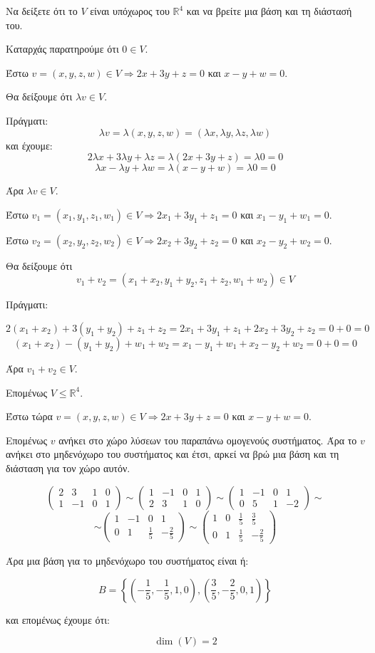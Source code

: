 \begin{enumerate}[1.]
Να δείξετε ότι το $V$ είναι υπόχωρος του $\mathbb{R}^4$ και να βρείτε μια βάση και τη διάστασή του.

\vspace{\baselineskip}


\vspace{\baselineskip}

Καταρχάς παρατηρούμε ότι $0\in V$. 

Έστω $v=(x,y,z,w)\in V \Rightarrow 2x+3y+z=0$ και $x-y+w=0$.

Θα δείξουμε ότι $\lambda v\in V$. 

Πράγματι:
\[
\lambda v=\lambda(x,y,z,w)=(\lambda x,\lambda y, \lambda z, \lambda w)
\]
και έχουμε:
\[
2\lambda x+3\lambda y +\lambda z= \lambda(2x+3y+z)=\lambda 0=0
\]
\[
\lambda x- \lambda y +\lambda w=\lambda(x-y+w)=\lambda 0 =0
\]

Άρα $\lambda v\in V$.

Έστω $v_1=(x_1,y_1,z_1,w_1)\in V \Rightarrow 2x_1+3y_1+z_1=0$ και $x_1-y_1+w_1=0$.

Έστω $v_2=(x_2,y_2,z_2,w_2)\in V \Rightarrow 2x_2+3y_2+z_2=0$ και $x_2-y_2+w_2=0$.

Θα δείξουμε ότι \[v_1+v_2=(x_1+x_2,y_1+y_2,z_1+z_2,w_1+w_2)\in V\] 

Πράγματι:

\[2(x_1+x_2)+3(y_1+y_2)+z_1+z_2=2x_1+3y_1+z_1+2x_2+3y_2+z_2=0+0=0\]
\[(x_1+x_2)-(y_1+y_2)+w_1+w_2=x_1-y_1+w_1+x_2-y_2+w_2=0+0=0\]

Άρα $v_1+v_2\in V$.

Επομένως $V\leq \mathbb{R}^4$.

Έστω τώρα $v=(x,y,z,w)\in V \Rightarrow 2x+3y+z=0$ και $x-y+w=0$.

Επομένως $v$ ανήκει στο χώρο λύσεων του παραπάνω ομογενούς συστήματος. Άρα το $v$ ανήκει στο μηδενόχωρο του συστήματος και έτσι, αρκεί να βρώ μια βάση και τη διάσταση για τον χώρο αυτόν. 


\[
\begin{pmatrix}
2 & 3 & 1 & 0 \\
1 & -1 & 0 & 1 
\end{pmatrix}
\sim
\begin{pmatrix}
1 & -1 & 0 & 1 \\
2 & 3 & 1 & 0 
\end{pmatrix}
\sim 
\begin{pmatrix}
1 & -1 & 0 & 1 \\
0 & 5 & 1 & -2
\end{pmatrix}
\sim 
\]
\[
\sim
\begin{pmatrix}
1 & -1 & 0 & 1 \\
0 & 1 & \frac{1}{5} & -\frac{2}{5}
\end{pmatrix}
\sim 
\begin{pmatrix}
1 & 0 & \frac{1}{5} & \frac{3}{5} \\
0 & 1 & \frac{1}{5} & -\frac{2}{5}
\end{pmatrix}
\]

\end{enumerate}

Άρα μια βάση για το μηδενόχωρο του συστήματος είναι ή:

\[
Β=\left\{(-\frac{1}{5},-\frac{1}{5},1,0), (\frac{3}{5},-\frac{2}{5},0,1)\right\}
\]

και επομένως έχουμε ότι:

\[
\dim(V)=2
\]

